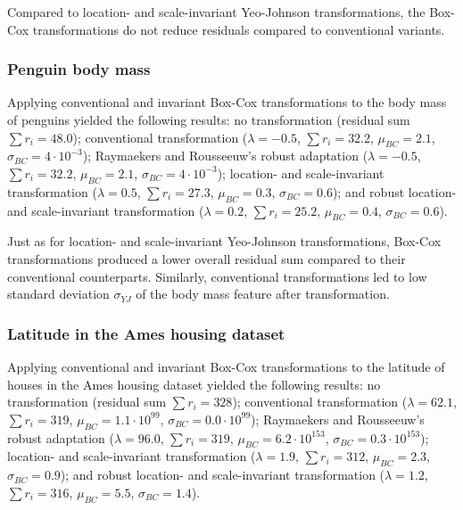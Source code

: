 \documentclass[preprint,12pt,authoryear]{elsarticle}
\begin{document}
Compared to location- and scale-invariant Yeo-Johnson transformations,
the Box-Cox transformations do not reduce residuals compared to
conventional variants.

\subsubsection{Penguin body mass}\label{sec-app:penguin-body-mass}

Applying conventional and invariant Box-Cox transformations to the body
mass of penguins \citep{Gorman2014-eo} yielded the
following results: no transformation (residual sum \(\sum r_i = 48.0\));
conventional transformation (\(\lambda = -0.5\), \(\sum r_i = 32.2\),
\(\mu_{BC} = 2.1\), \(\sigma_{BC} = 4 \cdot 10^{-3}\)); Raymaekers and
Rousseeuw's robust adaptation (\(\lambda = -0.5\), \(\sum r_i = 32.2\),
\(\mu_{BC} = 2.1\), \(\sigma_{BC} = 4 \cdot 10^{-3}\)); location- and
scale-invariant transformation (\(\lambda = 0.5\), \(\sum r_i = 27.3\),
\(\mu_{BC} = 0.3\), \(\sigma_{BC} = 0.6\)); and robust location- and
scale-invariant transformation (\(\lambda = 0.2\), \(\sum r_i = 25.2\),
\(\mu_{BC} = 0.4\), \(\sigma_{BC} = 0.6\)).

Just as for location- and scale-invariant Yeo-Johnson transformations,
Box-Cox transformations produced a lower overall residual sum compared
to their conventional counterparts. Similarly, conventional
transformations led to low standard deviation \(\sigma_{YJ}\) of the
body mass feature after transformation.

\subsubsection{Latitude in the Ames housing
dataset}\label{sec-app:latitude-in-the-ames-housing-dataset}

Applying conventional and invariant Box-Cox transformations to the
latitude of houses in the Ames housing dataset \citep{De-Cock2011-jf} yielded
the following results: no transformation (residual sum
\(\sum r_i = 328\)); conventional transformation (\(\lambda = 62.1\),
\(\sum r_i = 319\), \(\mu_{BC} = 1.1 \cdot 10^{99}\),
\(\sigma_{BC} = 0.0 \cdot 10^{99}\)); Raymaekers and Rousseeuw's robust
adaptation (\(\lambda = 96.0\), \(\sum r_i = 319\),
\(\mu_{BC} = 6.2 \cdot 10^{153}\),
\(\sigma_{BC} = 0.3 \cdot 10^{153}\)); location- and scale-invariant
transformation (\(\lambda = 1.9\), \(\sum r_i = 312\),
\(\mu_{BC} = 2.3\), \(\sigma_{BC} = 0.9\)); and robust location- and
scale-invariant transformation (\(\lambda = 1.2\), \(\sum r_i = 316\),
\(\mu_{BC} = 5.5\), \(\sigma_{BC} = 1.4\)).
\end{document}
